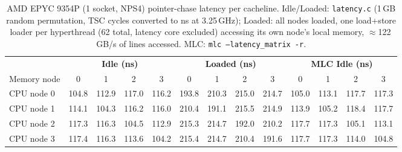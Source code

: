 \begin{table}[t] \centering \small \setlength{\tabcolsep}{5pt}
\renewcommand{\arraystretch}{1.2}

\begin{tabular}{|l|cccc|cccc||cccc|}
\hline

& \multicolumn{4}{c|}{\textbf{Idle (ns)}}
& \multicolumn{4}{c||}{\textbf{Loaded (ns)}}
& \multicolumn{4}{c|}{\textbf{MLC Idle (ns)}} \\
\cline{2-13}

Memory node & 0 & 1 & 2 & 3 & 0 & 1 & 2 & 3 & 0 & 1 & 2 & 3 \\
\hline\hline
CPU node 0 & 104.8 & 112.9 & 117.0 & 116.2 & 193.8 & 210.3 & 215.0 & 214.7 & 105.0 & 113.1 & 117.7 & 117.3 \\
\hline
CPU node 1 & 114.1 & 104.3 & 116.2 & 116.0 & 210.4 & 191.1 & 215.5 & 214.9 & 113.9 & 105.2 & 118.4 & 117.7 \\
\hline
CPU node 2 & 117.3 & 116.3 & 104.5 & 112.9 & 215.3 & 214.7 & 192.0 & 210.2 & 117.7 & 117.3 & 105.1 & 113.1 \\
\hline
CPU node 3 & 117.4 & 116.3 & 113.6 & 104.2 & 215.4 & 214.7 & 210.4 & 191.6 & 117.7 & 117.3 & 114.0 & 104.8 \\
\hline

\end{tabular}

\caption{AMD EPYC 9354P (1 socket, NPS4) pointer-chase latency per cacheline. Idle/Loaded: \texttt{latency.c} (1\,GB random permutation, TSC cycles converted to ns at 3.25\,GHz); Loaded: all nodes loaded, one load+store loader per hyperthread (62 total, latency core excluded) accessing its own node's local memory, $\approx$122\,GB/s of lines accessed. MLC: \texttt{mlc --latency\_matrix -r}.}
\label{tab:amd-latency}
\end{table}

